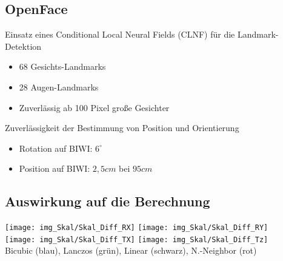 \subsection{OpenFace}
\begin{frame}
Einsatz eines Conditional Local Neural Fields (CLNF) für die Landmark-Detektion
\begin{itemize}
	\item<1-> 68 Gesichts-Landmarks
	\item<1-> 28 Augen-Landmarks
	\item<1-> Zuverlässig ab 100 Pixel große Gesichter
\end{itemize}
Zuverlässigkeit der Bestimmung von Position und Orientierung
\begin{itemize}
	\item<1-> Rotation auf BIWI: $6^\circ$
	\item<1-> Position auf BIWI: $2,5cm$ bei $95cm$
\end{itemize}
\end{frame}
\subsection{Auswirkung auf die Berechnung}
\begin{frame}
\begin{center}
\texttt{[image: img\_Skal/Skal\_Diff\_RX]}
\texttt{[image: img\_Skal/Skal\_Diff\_RY]}\\
\texttt{[image: img\_Skal/Skal\_Diff\_TX]}
\texttt{[image: img\_Skal/Skal\_Diff\_Tz]}\\
\footnotesize{Bicubic (blau), Lanczos (grün), Linear (schwarz), N.-Neighbor (rot)}
\end{center}
\end{frame}
